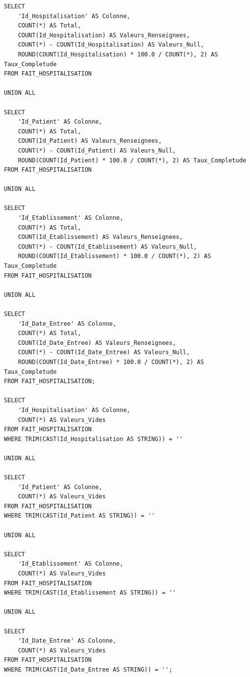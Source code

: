 \begin{verbatim}
SELECT
    'Id_Hospitalisation' AS Colonne,
    COUNT(*) AS Total,
    COUNT(Id_Hospitalisation) AS Valeurs_Renseignees,
    COUNT(*) - COUNT(Id_Hospitalisation) AS Valeurs_Null,
    ROUND(COUNT(Id_Hospitalisation) * 100.0 / COUNT(*), 2) AS Taux_Completude
FROM FAIT_HOSPITALISATION

UNION ALL

SELECT
    'Id_Patient' AS Colonne,
    COUNT(*) AS Total,
    COUNT(Id_Patient) AS Valeurs_Renseignees,
    COUNT(*) - COUNT(Id_Patient) AS Valeurs_Null,
    ROUND(COUNT(Id_Patient) * 100.0 / COUNT(*), 2) AS Taux_Completude
FROM FAIT_HOSPITALISATION

UNION ALL

SELECT
    'Id_Etablissement' AS Colonne,
    COUNT(*) AS Total,
    COUNT(Id_Etablissement) AS Valeurs_Renseignees,
    COUNT(*) - COUNT(Id_Etablissement) AS Valeurs_Null,
    ROUND(COUNT(Id_Etablissement) * 100.0 / COUNT(*), 2) AS Taux_Completude
FROM FAIT_HOSPITALISATION

UNION ALL

SELECT
    'Id_Date_Entree' AS Colonne,
    COUNT(*) AS Total,
    COUNT(Id_Date_Entree) AS Valeurs_Renseignees,
    COUNT(*) - COUNT(Id_Date_Entree) AS Valeurs_Null,
    ROUND(COUNT(Id_Date_Entree) * 100.0 / COUNT(*), 2) AS Taux_Completude
FROM FAIT_HOSPITALISATION;

SELECT
    'Id_Hospitalisation' AS Colonne,
    COUNT(*) AS Valeurs_Vides
FROM FAIT_HOSPITALISATION
WHERE TRIM(CAST(Id_Hospitalisation AS STRING)) = ''

UNION ALL

SELECT
    'Id_Patient' AS Colonne,
    COUNT(*) AS Valeurs_Vides
FROM FAIT_HOSPITALISATION
WHERE TRIM(CAST(Id_Patient AS STRING)) = ''

UNION ALL

SELECT
    'Id_Etablissement' AS Colonne,
    COUNT(*) AS Valeurs_Vides
FROM FAIT_HOSPITALISATION
WHERE TRIM(CAST(Id_Etablissement AS STRING)) = ''

UNION ALL

SELECT
    'Id_Date_Entree' AS Colonne,
    COUNT(*) AS Valeurs_Vides
FROM FAIT_HOSPITALISATION
WHERE TRIM(CAST(Id_Date_Entree AS STRING)) = '';
\end{verbatim}

